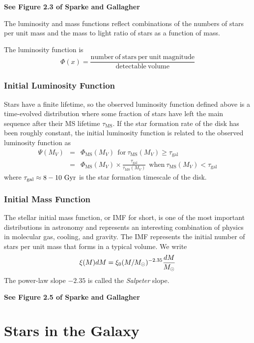 \documentclass[]{article}
\begin{document}
{\bf See Figure 2.3 of Sparke and Gallagher}

The luminosity and mass functions reflect combinations
of the numbers of stars per unit mass and the
mass to light ratio of stars as a function of mass.

The luminosity function is
\begin{equation}
\Phi(x) = \frac{\mathrm{number~of~stars~per~unit~magnitude}}{\mathrm{detectable~volume}}
\end{equation}

\subsubsection{Initial Luminosity Function}
Stars have a finite lifetime, so the observed luminosity
function defined above is a time-evolved distribution
where some fraction of stars have left the main sequence
after their MS lifetime $\tau_{\mathrm{MS}}$.
If the star formation rate of the disk has been roughly
constant, the initial luminosity function
is related to the observed luminosity function as
\begin{eqnarray}
\Psi(M_{V}) &=& \Phi_{\mathrm{MS}}(M_V)~~\mathrm{for~}\tau_{\mathrm{MS}}(M_V)\ge\tau_{\mathrm{gal}} \\
&=& \Phi_{\mathrm{MS}}(M_V)\times\frac{\tau_{\mathrm{gal}}}{\tau_{\mathrm{MS}}(M_V)}~~\mathrm{when~}\tau_{\mathrm{MS}}(M_V)<\tau_{\mathrm{gal}} \nonumber
\end{eqnarray}
\noindent
where $\tau_\mathrm{gal}\approx8-10~\mathrm{Gyr}$ is the star formation timescale
of the disk.

\subsubsection{Initial Mass Function}

The stellar initial mass function, or IMF for short,
is one of the most important distributions in astronomy
and represents an interesting combination of physics in
molecular gas, cooling, and gravity. The IMF represents
the initial number of stars per unit mass that forms
in a typical volume.  We write
\begin{equation}
\xi(M) dM = \xi_0 (M/M_{\odot})^{-2.35}\frac{dM}{M_{\odot}}
\end{equation}
\noindent
The power-law slope $-2.35$ is called the {\it Salpeter}
slope.

{\bf See Figure 2.5 of Sparke and Gallagher}

\section{Stars in the Galaxy}
\end{document}
